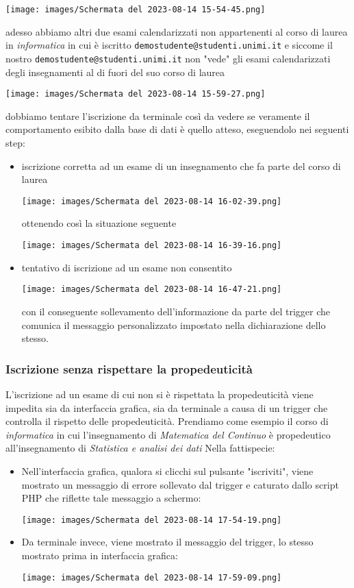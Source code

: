 \documentclass{article}
\newcommand{\und}[0]{\textunderscore}
\begin{document}
\texttt{[image: images/Schermata del 2023-08-14 15-54-45.png]}

adesso abbiamo altri due esami calendarizzati non appartenenti al corso di laurea in \textit{informatica} in cui è iscritto \texttt{demo\und studente@studenti.unimi.it} e siccome il nostro \texttt{demo\und studente@studenti.unimi.it} non "vede" gli esami calendarizzati degli insegnamenti al di fuori del suo corso di laurea

\texttt{[image: images/Schermata del 2023-08-14 15-59-27.png]}

dobbiamo tentare l'iscrizione da terminale così da vedere se veramente il comportamento esibito dalla base di dati è quello atteso, eseguendolo nei seguenti step:
\begin{itemize}
    \item iscrizione corretta ad un esame di un insegnamento che fa parte del corso di laurea

    \texttt{[image: images/Schermata del 2023-08-14 16-02-39.png]}

    ottenendo così la situazione seguente

    \texttt{[image: images/Schermata del 2023-08-14 16-39-16.png]}

    \pagebreak

    \item tentativo di iscrizione ad un esame non consentito

    \texttt{[image: images/Schermata del 2023-08-14 16-47-21.png]}

    con il conseguente sollevamento dell'informazione da parte del trigger che comunica il messaggio personalizzato impostato nella dichiarazione dello stesso.

\end{itemize}

\subsubsection{Iscrizione senza rispettare la propedeuticità}
L'iscrizione ad un esame di cui non si è rispettata la propedeuticità viene impedita sia da interfaccia grafica, sia da terminale a causa di un trigger che controlla il rispetto delle propedeuticità. Prendiamo come esempio il corso di \textit{informatica} in cui l'insegnamento di \textit{Matematica del Continuo} è propedeutico all'insegnamento di \textit{Statistica e analisi dei dati}
Nella fattispecie:
\begin{itemize}
    \item Nell'interfaccia grafica, qualora si clicchi sul pulsante "iscriviti", viene mostrato un messaggio di errore sollevato dal trigger e caturato dallo script PHP che riflette tale messaggio a schermo:

    \texttt{[image: images/Schermata del 2023-08-14 17-54-19.png]}

    \item Da terminale invece, viene mostrato il messaggio del trigger, lo stesso mostrato prima in interfaccia grafica:

    \texttt{[image: images/Schermata del 2023-08-14 17-59-09.png]}
\end{itemize}
\end{document}
